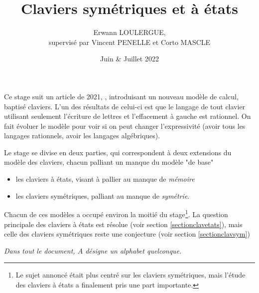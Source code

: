 \documentclass[12pt, a4paper]{article}
\title{Claviers symétriques et à états}
\author{Erwann LOULERGUE, \\ supervisé par Vincent PENELLE et Corto MASCLE}
\date{Juin \& Juillet 2022}
\begin{document}
    \maketitle
    Ce stage suit un article de 2021, \cite{bible}, introduisant un nouveau modèle de calcul,
    baptisé claviers. L’un des résultats de celui-ci est que le langage de tout clavier
    utilisant seulement l’écriture de lettres et l’effacement à gauche est rationnel. 
    On fait évoluer le modèle pour voir si on peut changer l'expressivité (avoir tous les langages rationnels, avoir les langages algébriques).
    
    Le stage se divise en deux parties, qui correspondent à deux extensions du modèle des claviers, chacun palliant un manque du modèle "de base"
    \begin{itemize}
        \item les claviers à états, visant à pallier au manque de \emph{mémoire}
        \item les claviers symétriques, palliant au manque de \emph{symétrie}.
    \end{itemize}
    Chacun de ces modèles a occupé environ la moitié du stage\footnote{Le sujet annoncé était plus centré sur les claviers symétriques, mais l'étude des claviers à états a finalement pris une part importante.}. 
    La question principale des claviers à états est résolue (voir section \ref{sectionclavetats}), mais celle des claviers symétriques reste une conjecture (voir section \ref{sectionclavsym})
    \clearpage    
    
    
    \emph{Dans tout le document, $A$ désigne un alphabet quelconque.}
\end{document}
